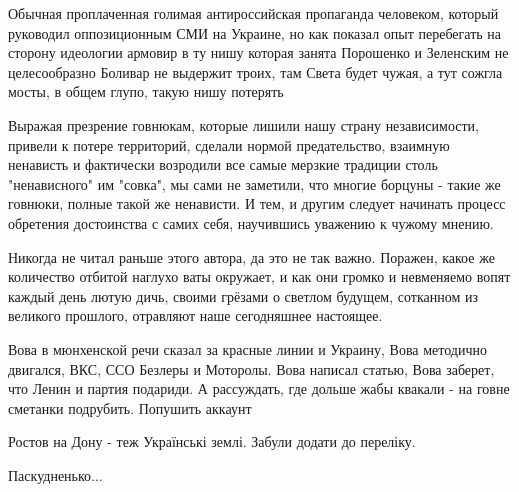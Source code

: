 \begin{itemize}
Обычная проплаченная голимая антироссийская пропаганда человеком, который
руководил оппозиционным СМИ на Украине, но как показал опыт перебегать на
сторону идеологии армовир в ту нишу которая занята Порошенко и Зеленским не
целесообразно Боливар не выдержит троих, там Света будет чужая, а тут сожгла
мосты, в общем глупо, такую нишу потерять


Выражая презрение говнюкам, которые лишили нашу страну независимости, привели к
потере территорий, сделали нормой предательство, взаимную ненависть и
фактически возродили все самые мерзкие традиции столь "ненависного" им "совка",
мы сами не заметили, что многие борцуны - такие же говнюки, полные такой же
ненависти. И тем, и другим следует начинать процесс обретения достоинства с
самих себя, научившись уважению к чужому мнению.

%
%

Никогда не читал раньше этого автора, да это не так важно.
Поражен, какое же количество отбитой наглухо ваты окружает, и как они громко и
невменяемо вопят каждый день лютую дичь, своими грёзами о светлом будущем,
сотканном из великого прошлого, отравляют наше сегодняшнее настоящее.

%
%

Вова в мюнхенской речи сказал за красные линии и Украину, Вова методично
двигался, ВКС, ССО Безлеры и Моторолы. Вова написал статью, Вова заберет, что
Ленин и партия подариди. А рассуждать, где дольше жабы квакали - на говне
сметанки подрубить. Попушить аккаунт

 
Ростов на Дону - теж Українські землі. Забули додати до переліку.

 
Паскудненько...

 

\end{itemize}
